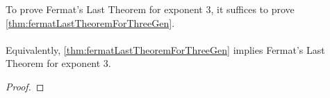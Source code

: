 \begin{lemma}
    \label{lmm:FermatLastTheoremForThree_of_FermatLastTheoremThreeGen}
    \leanok
    To prove Fermat's Last Theorem for exponent $3$,
    it suffices to prove \ref{thm:fermatLastTheoremForThreeGen}. \\\\
    Equivalently, \ref{thm:fermatLastTheoremForThreeGen} implies
    Fermat's Last Theorem for exponent $3$.
\end{lemma}
\begin{proof}
    \leanok
\end{proof}